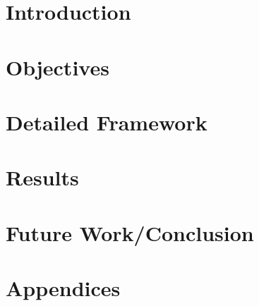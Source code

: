 \documentclass[12pt]{article}
\begin{document}
\begin{titlepage}
	
\end{titlepage}

\section{Introduction}


\section{Objectives}


\section{Detailed Framework}


\section{Results}


\section{Future Work/Conclusion}


\section*{Appendices}

\end{document}
